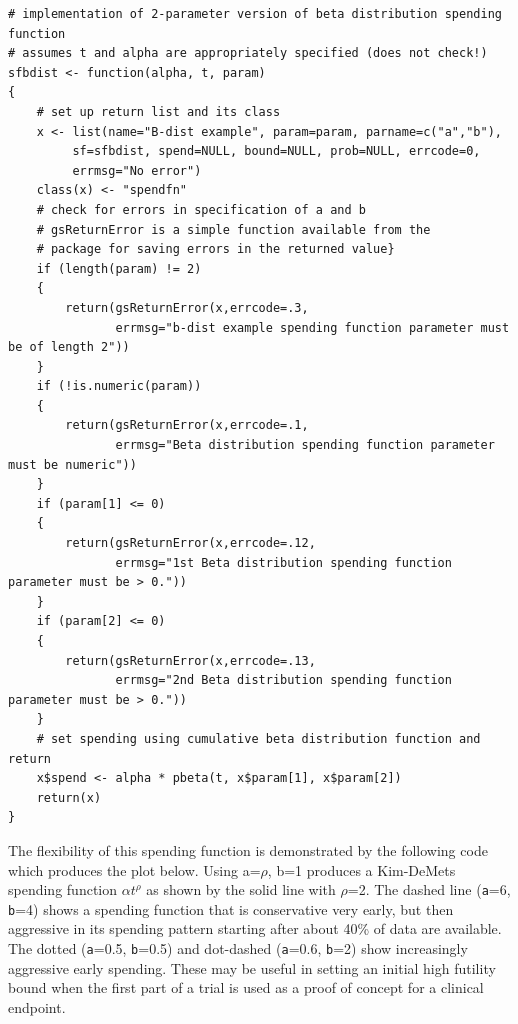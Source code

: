 \bigskip
\begin{verbatim}
# implementation of 2-parameter version of beta distribution spending function
# assumes t and alpha are appropriately specified (does not check!)
sfbdist <- function(alpha, t, param)
{
    # set up return list and its class
    x <- list(name="B-dist example", param=param, parname=c("a","b"), 
         sf=sfbdist, spend=NULL, bound=NULL, prob=NULL, errcode=0, 
         errmsg="No error")
    class(x) <- "spendfn"
    # check for errors in specification of a and b
    # gsReturnError is a simple function available from the 
    # package for saving errors in the returned value}
    if (length(param) != 2) 
    {
        return(gsReturnError(x,errcode=.3,
               errmsg="b-dist example spending function parameter must be of length 2"))
    }
    if (!is.numeric(param)) 
    {
        return(gsReturnError(x,errcode=.1,
               errmsg="Beta distribution spending function parameter must be numeric"))
    }
    if (param[1] <= 0) 
    {
        return(gsReturnError(x,errcode=.12,
               errmsg="1st Beta distribution spending function parameter must be > 0."))
    }
    if (param[2] <= 0) 
    {
        return(gsReturnError(x,errcode=.13,
               errmsg="2nd Beta distribution spending function parameter must be > 0."))
    }
    # set spending using cumulative beta distribution function and return
    x$spend <- alpha * pbeta(t, x$param[1], x$param[2])
    return(x)
}
\end{verbatim}
\bigskip

The flexibility of this spending function is demonstrated by the following
code which produces the plot below. Using a=$\rho$, b=1 produces a Kim-DeMets
spending function $\alpha t^{\rho}$ as shown by the solid line with $\rho$=2.
The dashed line (\texttt{a}=6, \texttt{b}=4) shows a spending function that is
conservative very early, but then aggressive in its spending pattern starting
after about 40\% of data are available. The dotted (\texttt{a}=0.5,
\texttt{b}=0.5) and dot-dashed (\texttt{a}=0.6, \texttt{b}=2) show
increasingly aggressive early spending. These may be useful in setting an
initial high futility bound when the first part of a trial is used as a proof
of concept for a clinical endpoint.

\bigskip

